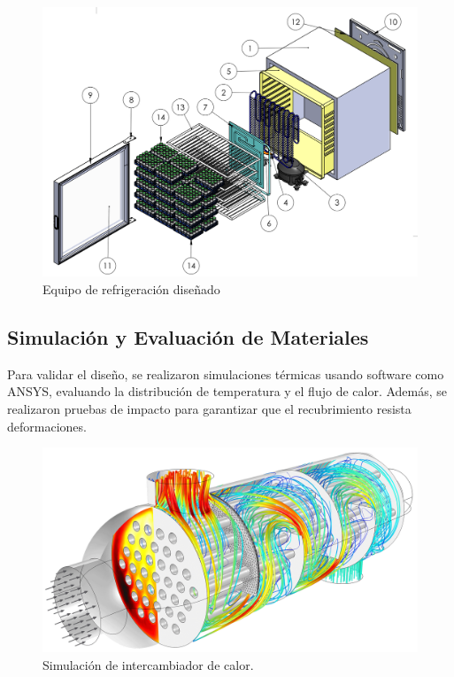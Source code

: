 \documentclass{article}
\begin{document}
\begin{multicols}{2}
 \begin{figure}[H]
 	\includegraphics[width=\linewidth]{figures/front-chapetr4.png}
 	\caption{Equipo de refrigeración diseñado}
 \end{figure}
 
	\subsection{Simulación y Evaluación de Materiales}
	Para validar el diseño, se realizaron simulaciones térmicas usando software como ANSYS, evaluando la distribución de temperatura y el flujo de calor. Además, se realizaron pruebas de impacto para garantizar que el recubrimiento resista deformaciones. \cite{areatecnologia}
	

 \begin{figure}[H]
 	\centering
 	\includegraphics[width=\linewidth]{figures/dist-intcalor}
 	\caption{Simulación de intercambiador de calor.}
 	\label{fig:dist-intcalor}
 \end{figure}
 

\end{multicols}
\end{document}
